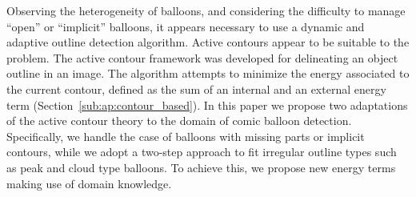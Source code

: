 Observing the heterogeneity of balloons, and considering the difficulty to manage ``open'' or ``implicit'' balloons, it appears necessary to use a dynamic and adaptive outline detection algorithm.
Active contours appear to be suitable to the problem.
The active contour framework was developed for delineating an object outline in an image.
The algorithm attempts to minimize the energy associated to the current contour, defined as the sum of an internal and an external energy term (Section~\ref{sub:ap:contour_based}). 
In this paper we propose two adaptations of the active contour theory to the domain of comic balloon detection.
Specifically, we handle the case of balloons with missing parts or implicit contours, while we adopt a two-step approach to fit irregular outline types such as peak and cloud type balloons. 
To achieve this, we propose new energy terms making use of domain knowledge.





